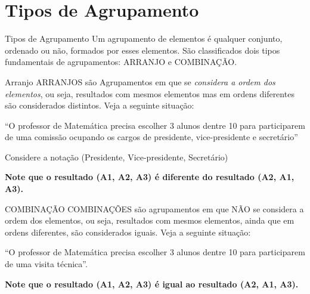 \documentclass[aspectratio=169,xcolor=dvipsnames]{beamer}
\begin{document}
\section{Tipos de Agrupamento}

\begin{frame}{Tipos de Agrupamento}
    Um agrupamento de elementos é qualquer conjunto, ordenado ou não, formados por esses elementos. São classificados dois tipos fundamentais de agrupamentos: ARRANJO e COMBINAÇÃO.
\end{frame}

\begin{frame}{Arranjo}
    ARRANJOS são Agrupamentos em que se \textit{considera a ordem dos elementos}, ou seja, resultados com mesmos
    elementos mas em ordens diferentes são considerados distintos. Veja a seguinte situação:
    \vspace{.5cm}

    ``O professor de Matemática precisa escolher 3 alunos dentre 10 para participarem de uma comissão ocupando os cargos de presidente, vice-presidente e secretário''
    \vspace{.5cm}

    Considere a notação (Presidente, Vice-presidente, Secretário)
    \vspace{.5cm}

    \textbf{Note que o resultado (A1, A2, A3) é diferente do resultado (A2, A1, A3).}

\end{frame}

\begin{frame}{COMBINAÇÃO}
    COMBINAÇÕES são agrupamentos em que NÃO se considera a ordem dos elementos, ou seja, resultados com mesmos elementos, ainda que em ordens diferentes, são considerados iguais. Veja a seguinte situação:

    \vspace{.5cm}
    ``O professor de Matemática precisa escolher 3 alunos dentre 10 para participarem de uma visita técnica''.
    \vspace{.5cm}

    \textbf{Note que o resultado (A1, A2, A3) é igual ao resultado (A2, A1, A3).}
\end{frame}
\end{document}
